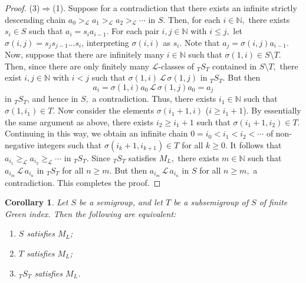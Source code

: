 \documentclass[twoside,a4paper,12pt,reqno]{amsart}
\theoremstyle{plain}
\newtheorem{cor}[thm]{Corollary}
\theoremstyle{definition}
\renewcommand{\l}{\mbox{${\mathcal{L}}$}}
\newcommand{\geql}{\geq_{\mathcal{L}}}
\newcommand{\gl}{>_{\mathcal{L}}}
\newcommand{\s}{\sigma}
\newcommand{\N}{\mathbb{N}}
\newcommand{\sm}{\setminus}
\begin{document}
\begin{proof}
(3)$\Rightarrow$(1).  Suppose for a contradiction that there exists an infinite strictly descending chain $a_0\gl a_1\gl a_2\gl\cdots$ in $S.$  Then, for each $i\in\N,$ there exists $s_i\in S$ such that $a_i=s_ia_{i-1}$.  For each pair $i,j\in\N$ with $i\leq j,$ let $\s(i,j)=s_js_{j-1}\dots s_i$, interpreting $\s(i,i)$ as $s_i$.  Note that $a_j=\s(i,j)a_{i-1}$.  Now, suppose that there are infinitely many $i\in\N$ such that $\s(1,i)\in S{\sm}T.$  Then, since there are only finitely many $\l$-classes of ${_T}S_T$ contained in $S{\sm}T,$ there exist $i,j\in\N$ with $i<j$ such that $\s(1,i)\,\l\,\s(1,j)$ in ${_T}S_T$.  But then
$$a_i=\s(1,i)a_0\,\l\,\s(1,j)a_0=a_j$$ 
in ${_T}S_T$, and hence in $S,$ a contradiction.  Thus, there exists $i_1\in\N$ such that $\s(1,i_1)\in T.$  Now consider the elements $\s(i_1+1,i)$ ($i\geq i_1+1$).  By essentially the same argument as above, there exists $i_2\geq i_1+1$ such that $\s(i_1+1,i_2)\in T.$  Continuing in this way, we obtain an infinite chain $0=i_0<i_1<i_2<\cdots$ of non-negative integers such that $\s(i_k+1,i_{k+1})\in T$ for all $k\geq 0.$  It follows that $a_{i_1}\geql a_{i_2}\geql\cdots$ in ${_T}S_T$.  Since ${_T}S_T$ satisfies $M_L,$ there exists $m\in\N$ such that $a_{i_m}\,\l\,a_{i_n}$ in ${_T}S_T$ for all $n\geq m.$  But then $a_{i_m}\,\l\,a_{i_n}$ in $S$ for all $n\geq m,$ a contradiction.  This completes the proof.
\end{proof}

\begin{cor}\label{cor:Greenindex}
Let $S$ be a semigroup, and let $T$ be a subsemigroup of $S$ of finite Green index.  Then the following are equivalent:
\begin{enumerate}[leftmargin=*]
\item[\emph{(1)}] $S$ satisfies $M_L$;
\item[\emph{(2)}] $T$ satisfies $M_L$;
\item[\emph{(3)}] ${_T}S_T$ satisfies $M_L$.
\end{enumerate}
\end{cor}

\end{document}
